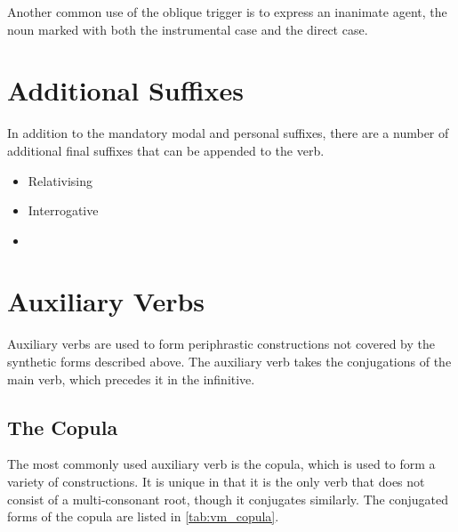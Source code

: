 \documentclass[grammar]{subfiles}
\begin{document}
  Another common use of the oblique trigger is to express an inanimate agent,
  the noun marked with both the instrumental case and the direct case.

  \newpage
  \section{Additional Suffixes}
  \label{sec:vm_additional_suffixes}

  In addition to the mandatory modal and personal suffixes, there are a number
  of additional final suffixes that can be appended to the verb. 

  \begin{itemize}
	  \item Relativising 
	  \item Interrogative 
	  \item \ToBeWritten
  \end{itemize}

  \newpage
  \section{Auxiliary Verbs}
  \label{sec:vm_auxiliary}

  Auxiliary verbs are used to form periphrastic constructions not covered by
  the synthetic forms described above.  The auxiliary verb takes the
  conjugations of the main verb, which precedes it in the infinitive.  

  \subsection{The Copula}
  \label{ssec:vm_copula}

  The most commonly used auxiliary verb is the copula, which is
  used to form a variety of constructions.  It is unique in that it is the only
  verb that does not consist of a multi-consonant root, though it conjugates
  similarly.  The conjugated forms of the copula are listed in \cref{tab:vm_copula}.
\end{document}
